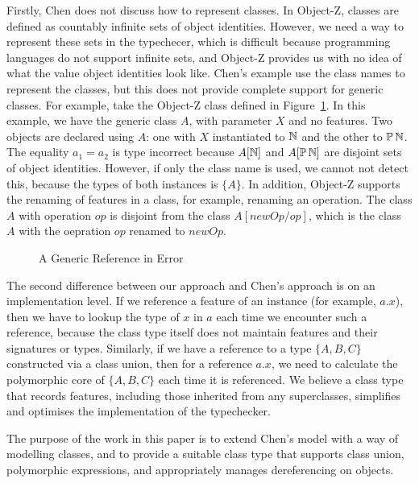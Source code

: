Firstly, Chen does not discuss how to represent classes. In Object-Z,
classes are defined as countably infinite sets of object
identities. However, we need a way to represent these sets in the
typechecer, which is difficult because programming languages do not
support infinite sets, and Object-Z provides us with no idea of what
the value object identities look like. Chen's example use the class
names to represent the classes, but this does not provide complete
support for generic classes. For example, take the Object-Z class
defined in Figure~\ref{generic-class-A}.  In this example, we have the
generic class $A$, with parameter $X$ and no features.  Two objects
are declared using $A$: one with $X$ instantiated to ${\mathbb N}$ and the
other to $\power \nat$. The equality $a_{1} = a_{2}$ is type incorrect
because $A[{\mathbb N}]$ and $A[\power \nat]$ are disjoint sets of object
identities. However, if only the class name is used, we cannot not
detect this, because the types of both instances is $\{A\}$. In
addition, Object-Z supports the renaming of features in a class, for
example, renaming an operation. The class $A$ with operation $op$ is
disjoint from the class $A[newOp/op]$, which is the class $A$ with
the oepration $op$ renamed to $newOp$.

\begin{figure}[t]

\caption{A Generic Reference in Error}
\label{generic-class-A}
\end{figure}


The second difference between our approach and Chen's approach is on
an implementation level. If we reference a feature of an instance (for
example, $a.x$), then we have to lookup the type of $x$ in $a$ each
time we encounter such a reference, because the class type itself does
not maintain features and their signatures or types.  Similarly, if we
have a reference to a type $\{ A, B, C\}$ constructed via a class
union, then for a reference $a.x$, we need to calculate the
polymorphic core of $\{A,B,C\}$ each time it is referenced. We believe
a class type that records features, including those inherited from any
superclasses, simplifies and optimises the implementation of the
typechecker.

The purpose of the work in this paper is to extend Chen's model with a
way of modelling classes, and to provide a suitable class type that
supports class union, polymorphic expressions, and appropriately
manages dereferencing on objects.
